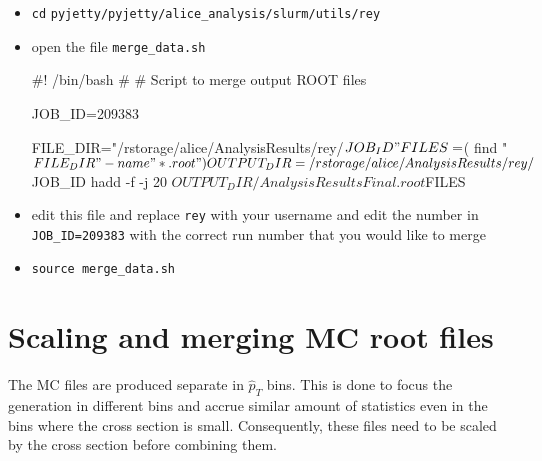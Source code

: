 \documentclass[12pt]{article}
\begin{document}
\begin{itemize}
\item \verb|cd| \verb|pyjetty/pyjetty/alice_analysis/slurm/utils/rey|
\item open the file \verb|merge_data.sh|

\begin{tcolorbox}
\begin{verbnobox}[\scriptsize]
#! /bin/bash
#
# Script to merge output ROOT files

JOB_ID=209383

FILE_DIR="/rstorage/alice/AnalysisResults/rey/$JOB_ID"
FILES=$( find "$FILE_DIR" -name "*.root" )

OUTPUT_DIR=/rstorage/alice/AnalysisResults/rey/$JOB_ID
hadd -f -j 20 $OUTPUT_DIR/AnalysisResultsFinal.root $FILES
\end{verbnobox}  
\end{tcolorbox}

\item edit this file and replace \verb|rey| with your username and edit the number in \verb|JOB_ID=209383| with the correct run number that you would like to merge
\item \verb|source merge_data.sh|
\end{itemize}

\section{Scaling and merging MC root files}

The MC files are produced separate in $\hat{p}_T$ bins. This is done to focus the generation in different bins
and accrue similar amount of statistics even in the bins where the cross section is small. Consequently, these files need to be scaled by the cross section
before combining them.
\end{document}
